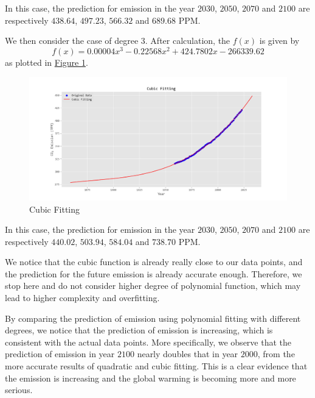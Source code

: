 \documentclass[12pt,a4paper]{article}
\begin{document}
    In this case, the prediction for  emission in the year $2030$, $2050$, $2070$ and $2100$ are respectively $438.64$, $497.23$, $566.32$ and $689.68$ PPM.

    We then consider the case of degree 3. After calculation, the $f(x)$ is given by
    \begin{equation}
        f(x)=0.00004x^3-0.22568x^2+424.7802x-266339.62
    \end{equation}
    as plotted in \hyperref[cubic_fitting]{Figure \ref*{cubic_fitting}}.

    \begin{figure}[htbp]
        \centering
        \includegraphics[width=1\linewidth]{img/cubic fitting.png}
        \caption{Cubic Fitting}
        \label{cubic_fitting}
    \end{figure}
    
    In this case, the prediction for  emission in the year $2030$, $2050$, $2070$ and $2100$ are respectively $440.02$, $503.94$, $584.04$ and $738.70$ PPM.
    
    We notice that the cubic function is already really close to our data points, and the prediction for the future  emission is already accurate enough. Therefore, we stop here and do not consider higher degree of polynomial function, which may lead to higher complexity and overfitting.
    
    By comparing the prediction of  emission using polynomial fitting with different degrees, we notice that the prediction of  emission is increasing, which is consistent with the actual data points. More specifically, we observe that the prediction of  emission in year $2100$ nearly doubles that in year $2000$, from the more accurate results of quadratic and cubic fitting. This is a clear evidence that the  emission is increasing and the global warming is becoming more and more serious.
    
\end{document}
